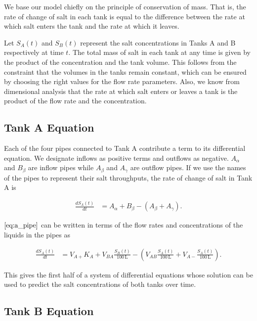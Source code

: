 We base our model chiefly on the principle of conservation of mass. That
is, the rate of change of salt in each tank is equal to the difference
between the rate at which salt enters the tank and the rate at which it
leaves.

Let \(S_A(t)\) and \(S_B(t)\) represent the salt concentrations in Tanks
A and B respectively at time \(t\). The total mass of salt in each tank
at any time is given by the product of the concentration and the tank
volume. This follows from the constraint that the volumes in the tanks
remain constant, which can be ensured by choosing the right values for
the flow rate parameters. Also, we know from dimensional analysis that
the rate at which salt enters or leaves a tank is the product of the
flow rate and the concentration.

\subsection{Tank A Equation}\label{tank-a-equation}

Each of the four pipes connected to Tank A contribute a term to its
differential equation. We designate inflows as positive terms and
outflows as negative. \(A_\alpha\) and \(B_\beta\) are inflow pipes
while \(A_\beta\) and \(A_\gamma\) are outflow pipes. If we use the
names of the pipes to represent their salt throughputs, the rate of
change of salt in Tank A is

\begin{align}
  \frac{dS_A(t)}{dt} &= A_\alpha + B_\beta - (A_\beta + A_\gamma). \label{eq:a_pipe}
\end{align}

\(\autoref{eq:a_pipe}\) can be written in terms of the flow rates and
concentrations of the liquids in the pipes as

\begin{align}
  \frac{dS_A(t)}{dt} &= V_{A+} K_A + V_{BA}\frac{S_B(t)}{100\,\text{L}} - \left(V_{AB}\frac{S_A(t)}{100\,\text{L}} + V_{A-}\frac{S_A(t)}{100\,\text{L}}\right). \label{eq:a_diff}
\end{align}

This gives the first half of a system of differential equations whose
solution can be used to predict the salt concentrations of both tanks
over time.

\subsection{Tank B Equation}\label{tank-b-equation}

